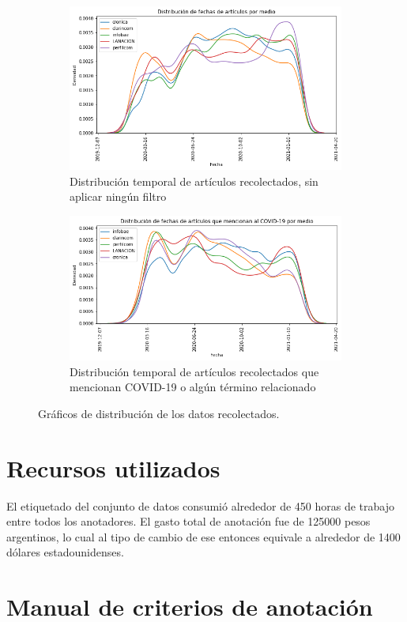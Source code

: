 \begin{figure}
    \centering
    \begin{subfigure}[t]{\textwidth}
        \includegraphics[width=\textwidth]{img/fechas_por_medios_todas.png}
        \caption{Distribución temporal de artículos recolectados, sin aplicar ningún filtro}
        \label{fig:fecha_articulos_por_medio_todas}
    \end{subfigure}

    \begin{subfigure}[t]{\textwidth}
        \includegraphics[width=\textwidth]{img/fechas_por_medios.png}
        \caption{Distribución temporal de artículos recolectados que mencionan COVID-19 o algún término relacionado}
        \label{fig:fecha_articulos_por_medio_covid}
    \end{subfigure}

    \caption{Gráficos de distribución de los datos recolectados.}
\end{figure}


\section{Recursos utilizados}

El etiquetado del conjunto de datos consumió alrededor de 450 horas de trabajo entre todos los anotadores. El gasto total de anotación fue de \num{125000} pesos argentinos, lo cual al tipo de cambio de ese entonces equivale a alrededor de \num{1400} dólares estadounidenses.

\section{Manual de criterios de anotación}
\label{app:manual_criterios_anotacion}

